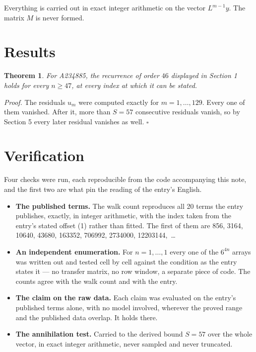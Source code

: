 \documentclass[11pt]{article}
\newtheorem{theorem}{Theorem}
\theoremstyle{definition}
\begin{document}
Everything is carried out in exact integer arithmetic on the vector $L^{m-1}y$. The matrix $M$ is never formed.

\section{Results}

\begin{theorem} For A234885, the recurrence of order $46$ displayed in Section 1 holds for every $n \ge 47$, at every index at which it can be stated.\end{theorem}

{\itshape Proof.} The residuals $u_m$ were computed exactly for $m = 1,\dots,129$. Every one of them vanished. After it, more than $S = 57$ consecutive residuals vanish, so by Section 5 every later residual vanishes as well. $\square$

\section{Verification}

Four checks were run, each reproducible from the code accompanying this note, and the first two are what pin the reading of the entry's English.

\begin{itemize}

\item {\bfseries The published terms.} The walk count reproduces all 20 terms the entry publishes, exactly, in integer arithmetic, with the index taken from the entry's stated offset (1) rather than fitted. The first of them are 856, 3164, 10640, 43680, 163352, 706992, 2734000, 12203144,~\dots

\item {\bfseries An independent enumeration.} For $n = 1,\dots,1$ every one of the $6^{4n}$ arrays was written out and tested cell by cell against the condition as the entry states it --- no transfer matrix, no row window, a separate piece of code. The counts agree with the walk count and with the entry.

\item {\bfseries The claim on the raw data.} Each claim was evaluated on the entry's published terms alone, with no model involved, wherever the proved range and the published data overlap. It holds there.

\item {\bfseries The annihilation test.} Carried to the derived bound $S = 57$ over the whole vector, in exact integer arithmetic, never sampled and never truncated.

\end{itemize}
\end{document}
